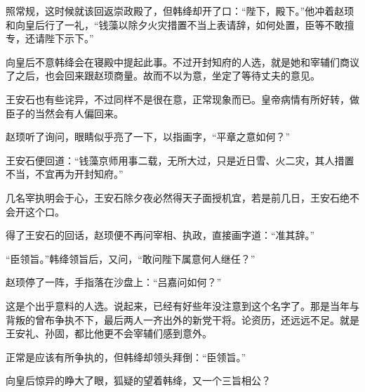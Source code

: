 照常规，这时候就该回返崇政殿了，但韩绛却开了口：“陛下，殿下。”他冲着赵顼和向皇后行了一礼，“钱藻以除夕火灾措置不当上表请辞，如何处置，臣等不敢擅专，还请陛下示下。”

向皇后不意韩绛会在寝殿中提起此事。不过开封知府的人选，就是她和宰辅们商议了之后，也会回来跟赵顼商量。故而不以为意，坐定了等待丈夫的意见。

王安石也有些诧异，不过同样不是很在意，正常现象而已。皇帝病情有所好转，做臣子的当然会有人偏回来。

赵顼听了询问，眼睛似乎亮了一下，以指画字，“平章之意如何？”

王安石便回道：“钱藻京师用事二载，无所大过，只是近日雪、火二灾，其人措置不当，不宜再为开封知府。”

几名宰执明会于心，王安石除夕夜必然得天子面授机宜，若是前几日，王安石绝不会开这个口。

得了王安石的回话，赵顼便不再问宰相、执政，直接画字道：“准其辞。”

“臣领旨。”韩绛领旨后，又问，“敢问陛下属意何人继任？”

赵顼停了一阵，手指落在沙盘上：“吕嘉问如何？”

这是个出乎意料的人选。说起来，已经有好些年没注意到这个名字了。那是当年与背叛的曾布争执不下，最后两人一齐出外的新党干将。论资历，还远远不足。就是王安礼、孙固，都比他更不会宰辅们感到意外。

正常是应该有所争执的，但韩绛却领头拜倒：“臣领旨。”

向皇后惊异的睁大了眼，狐疑的望着韩绛，又一个三旨相公？
